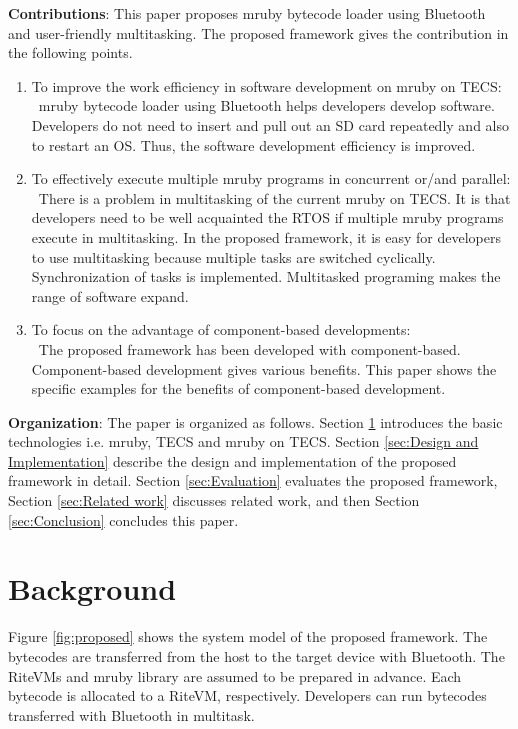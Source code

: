 \documentclass[conference,compsoc]{IEEEtran}
\begin{document}
{\bf Contributions}: This paper proposes mruby bytecode loader using Bluetooth and user-friendly multitasking.
The proposed framework gives the contribution in the following points.
\begin{enumerate}
\item To improve the  work efficiency in software development on mruby on TECS: \mbox{}\\
\ mruby bytecode loader using Bluetooth helps developers develop software.
Developers do not need to insert and pull out an SD card repeatedly and also to restart an OS.
 Thus, the software development efficiency is improved.
\item To effectively execute multiple mruby programs in concurrent or/and parallel: \mbox{}\\
\ There is a problem in multitasking of the current mruby on TECS.
It is that developers need to be well acquainted the RTOS if multiple mruby programs execute in multitasking.
In the proposed framework, it is easy for developers to use multitasking because multiple tasks are switched cyclically.
Synchronization of tasks is implemented.
Multitasked programing makes the range of software expand.
\item To focus on the advantage of component-based developments: \mbox{}\\
\ The proposed framework has been developed with component-based.
Component-based development gives various benefits.
This paper shows the specific examples for the benefits of component-based development. 
\end{enumerate}

{\bf Organization}: The paper is organized as follows.
Section \ref{sec:Background} introduces the basic technologies i.e. mruby, TECS and mruby on TECS.
Section \ref{sec:Design and Implementation} describe the design and implementation of the proposed framework in detail.
Section \ref{sec:Evaluation} evaluates the proposed framework, Section \ref{sec:Related work} discusses related work, and then Section \ref{sec:Conclusion} concludes this paper.

\section{Background}
\label{sec:Background}
Figure \ref{fig:proposed} shows the system model of the proposed framework.
The bytecodes are transferred from the host to the target device with Bluetooth.
The RiteVMs and mruby library are assumed to be prepared in advance.
Each bytecode is allocated to a RiteVM, respectively.
Developers can run bytecodes transferred with Bluetooth in multitask.
\end{document}

